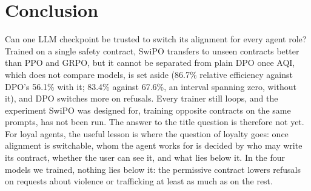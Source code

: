 \documentclass[letterpaper]{article} %
\begin{document}
\section{Conclusion}

Can one LLM checkpoint be trusted to switch its alignment for every agent role? Trained on a single safety contract, SwiPO transfers to unseen contracts better than PPO and GRPO, but it cannot be separated from plain DPO once AQI, which does not compare models, is set aside (86.7\% relative efficiency against DPO's 56.1\% with it; 83.4\% against 67.6\%, an interval spanning zero, without it), and DPO switches more on refusals. Every trainer still loops, and the experiment SwiPO was designed for, training opposite contracts on the same prompts, has not been run. The answer to the title question is therefore not yet. For loyal agents, the useful lesson is where the question of loyalty goes: once alignment is switchable, whom the agent works for is decided by who may write its contract, whether the user can see it, and what lies below it. In the four models we trained, nothing lies below it: the permissive contract lowers refusals on requests about violence or trafficking at least as much as on the rest.

{\small

}
\end{document}

